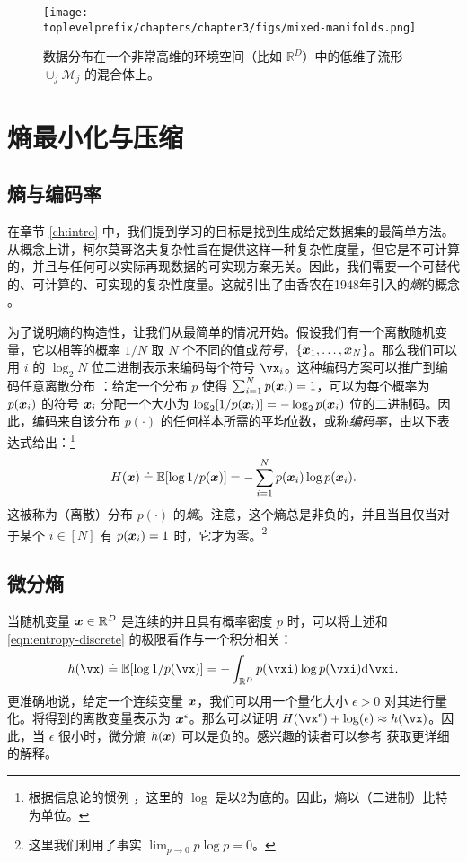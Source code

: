 \documentclass[../../book-main_zh.tex]{subfiles}
\begin{document}
\begin{figure}
    \centering
    \texttt{[image: \\toplevelprefix/chapters/chapter3/figs/mixed-manifolds.png]}
    \caption{数据分布在一个非常高维的环境空间（比如 $\mathbb{R}^D$）中的低维子流形 $\cup_j \mathcal{M}_j$ 的混合体上。}
    \label{fig:mixture-manifolds}
\end{figure}


\section{熵最小化与压缩}

\subsection{熵与编码率}
在章节 \ref{ch:intro} 中，我们提到学习的目标是找到生成给定数据集的最简单方法。从概念上讲，柯尔莫哥洛夫复杂性旨在提供这样一种复杂性度量，但它是不可计算的，并且与任何可以实际再现数据的可实现方案无关。因此，我们需要一个可替代的、可计算的、可实现的复杂性度量。这就引出了由香农在1948年引入的{\em 熵}的概念 \cite{Shannon-1948}。

为了说明熵的构造性，让我们从最简单的情况开始。假设我们有一个离散随机变量，它以相等的概率 $1/N$ 取 $N$ 个不同的值或\textit{符号}，$\{\bm{x}_1, \ldots, \bm{x}_N\}$。那么我们可以用 \(i\) 的 \(\log_2 N\) 位二进制表示来编码每个符号 \(\vx_{i}\)。这种编码方案可以推广到编码任意离散分布 \cite{Cover-Thomas}：给定一个分布 \(p\) 使得 $\sum_{i=1}^N p(\bm{x}_i) = 1$，可以为每个概率为 $p(\bm{x}_i)$ 的符号 $\bm{x}_i$ 分配一个大小为 $\log_2 [1/p(\bm{x}_i)] = - \log_2 p(\bm{x}_i)$ 位的二进制码。因此，编码来自该分布 $p(\cdot)$ 的任何样本所需的平均位数，或称{\em 编码率}，由以下表达式给出：\footnote{根据信息论的惯例 \cite{Cover-Thomas}，这里的 $\log$ 是以2为底的。因此，熵以（二进制）比特为单位。}
\begin{equation}
	H(\bm{x}) \doteq \mathbb{E}[\log 1/p(\bm{x})]  = - \sum_{i=1}^N p(\bm{x}_i) \log  p(\bm{x}_i).
	\label{eqn:entropy-discrete}
\end{equation}
这被称为（离散）分布 $p(\cdot)$ 的{\em 熵}。注意，这个熵总是非负的，并且当且仅当对于某个 $i \in [N]$ 有 $p(\bm{x}_i) = 1$ 时，它才为零。\footnote{这里我们利用了事实 $\lim_{p\rightarrow 0} p \log p = 0$。}


\subsection{微分熵}

当随机变量 $\bm{x} \in \mathbb{R}^{D}$ 是连续的并且具有概率密度 $p$ 时，可以将上述和 \eqref{eqn:entropy-discrete} 的极限看作与一个积分相关：
\begin{equation}
	h(\vx) \doteq \Ex[\log 1/p(\vx)] = - \int_{\R^{D}} p(\vxi) \log p(\vxi) \odif{\vxi}.
	\label{eqn:entropy-differential}
\end{equation}
{更准确地说，给定一个连续变量 $\bm{x}$，我们可以用一个量化大小 $\epsilon > 0$ 对其进行量化。将得到的离散变量表示为 $\bm{x}^\epsilon$。那么可以证明 $H(\vx^\epsilon) + \log(\epsilon) \approx h(\vx)$。因此，当 $\epsilon$ 很小时，微分熵 $h(\bm{x})$ 可以是负的。感兴趣的读者可以参考 \cite{Cover-Thomas} 获取更详细的解释。}
\end{document}
